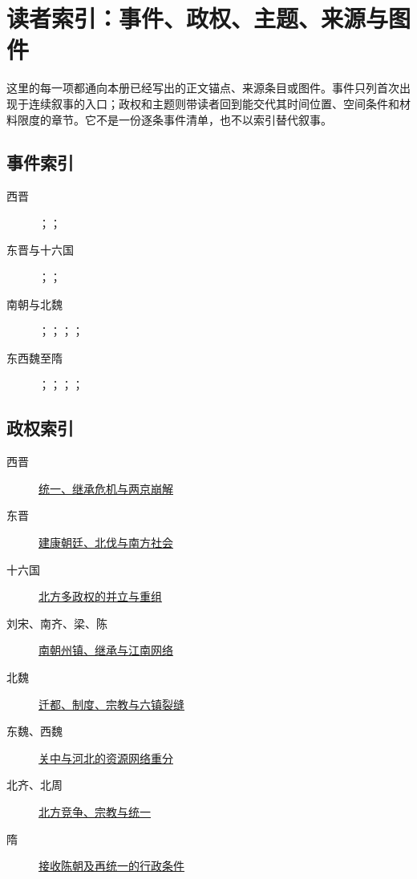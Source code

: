 \chapter{读者索引：事件、政权、主题、来源与图件}
\label{app:index}

这里的每一项都通向本册已经写出的正文锚点、来源条目或图件。事件只列首次出现于连续叙事的入口；政权和主题则带读者回到能交代其时间位置、空间条件和材料限度的章节。它不是一份逐条事件清单，也不以索引替代叙事。

\section{事件索引}
\begin{description}
  \item[西晋] ；；
  \item[东晋与十六国] ；；
  \item[南朝与北魏] ；；；；
  \item[东西魏至隋] ；；；；
\end{description}

\section{政权索引}
\begin{description}
  \item[西晋] \hyperref[ch:western-jin]{统一、继承危机与两京崩解}
  \item[东晋] \hyperref[ch:eastern-jin-sixteen-kingdoms]{建康朝廷、北伐与南方社会}
  \item[十六国] \hyperref[ch:eastern-jin-sixteen-kingdoms]{北方多政权的并立与重组}
  \item[刘宋、南齐、梁、陈] \hyperref[ch:northern-southern-dynasties]{南朝州镇、继承与江南网络}
  \item[北魏] \hyperref[sec:northern-wei-reform-fracture]{迁都、制度、宗教与六镇裂缝}
  \item[东魏、西魏] \hyperref[ch:eastern-western-wei]{关中与河北的资源网络重分}
  \item[北齐、北周] \hyperref[ch:northern-qi-zhou-chen-sui]{北方竞争、宗教与统一}
  \item[隋] \hyperref[sec:chen-sui-reunification]{接收陈朝及再统一的行政条件}
\end{description}

